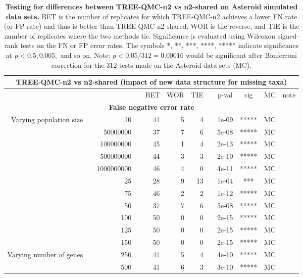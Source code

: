 \begin{table}[!h]
\caption[Statistical testing for TREE-QMC-n2 vs n2-shared on Asteroid data]{
\textbf{Testing for differences between TREE-QMC-n2 vs n2-shared on Asteroid simulated data sets.}
BET is the number of replicates for which TREE-QMC-n2 achieves a lower FN rate (or FP rate) and thus is better than TREE-QMC-n2-shared, WOR is the reverse, and TIE is the number of replicates where the two methods tie.
Significance is evaluated using Wilcoxon signed-rank tests on the FN or FP error rates.
The symbols *, **, ***, ****, ***** indicate significance at $p < 0.5, 0.005,$ and so on.
Note: $p < 0.05 / 312 = 0.00016$ would be significant after Bonferroni correction for the 312 tests made on the Asteroid data sets (MC).}
\centering
\scriptsize
\begin{tabular}{r r r l r r r l c c c l}
\toprule 
\multicolumn{12}{c}{\textbf{TREE-QMC-n2 vs n2-shared (impact of new data structure for missing taxa)}} \\
\midrule
\multirow{ 1}{2cm}{}
& & & & BET & WOR & TIE & & p-val & sig & MC & note \\
\midrule
\multicolumn{12}{c}{\textbf{False negative error rate}} \\
\midrule
\multirow{ 6}{2cm}{Varying population size}
  & & 10 & & 41 & 5 & 4 & & 1e-09 & ***** & MC &  \\
  & & 50000000 & & 37 & 7 & 6 & & 5e-08 & ***** & MC &  \\
  & & 100000000 & & 45 & 1 & 4 & & 2e-13 & ***** & MC &  \\
  & & 500000000 & & 44 & 3 & 3 & & 2e-10 & ***** & MC &  \\
  & & 1000000000 & & 46 & 4 & 0 & & 4e-11 & ***** & MC &  \\
\midrule
\multirow{ 6}{2cm}{Varying number of taxa}
   & & 25 & & 28 & 9 & 13 & & 1e-04 & *** & MC &  \\
   & & 75 & & 46 & 2 & 2 & & 1e-12 & ***** & MC &  \\
   & & 50 & & 37 & 7 & 6 & & 5e-08 & ***** & MC &  \\
   & & 100 & & 50 & 0 & 0 & & 2e-15 & ***** & MC &  \\
   & & 125 & & 50 & 0 & 0 & & 2e-15 & ***** & MC &  \\
   & & 150 & & 50 & 0 & 0 & & 2e-15 & ***** & MC &  \\
\midrule
\multirow{ 4}{2cm}{Varying number of genes}
   & & 250 & & 41 & 5 & 4 & & 4e-10 & ***** & MC &  \\
   & & 500 & & 41 & 6 & 3 & & 3e-10 & ***** & MC &  \\

\end{tabular}
\end{table}
